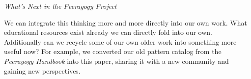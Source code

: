 
\begin{framed}
\noindent 
\emph{What's Next in the Peeragogy Project}
\begin{collectinmacro}{\ReduceWN}{}{}
We can integrate this thinking more and more directly into our own work. What educational resources exist already we can directly fold into our own. Additionally can we recycle some of our own older work into something more useful now? For example, we converted our old pattern catalog from the \emph{Peeragogy Handbook} into this paper, sharing it with a new community and gaining new perspectives.
\end{collectinmacro}
\ReduceWN
\end{framed}



    
    
